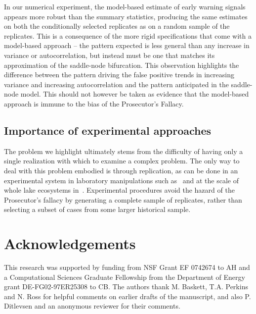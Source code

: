 \documentclass[authoryear,review,12pt]{elsarticle}
\begin{document}
In our numerical experiment, the model-based estimate of early warning
signals appears more robust than the summary statistics, producing
the same estimates on both the conditionally selected replicates as on
a random sample of the replicates.  This is a consequence of the more
rigid specifications that come with a model-based approach -- the pattern
expected is less general than any increase in variance or autocorrelation,
but instead must be one that matches its approximation of the saddle-node
bifurcation. This observation highlights the difference between the
pattern driving the false positive trends in increasing variance and
increasing autocorrelation and the pattern anticipated in the saddle-node
model. This should not however be taken as evidence that the model-based
approach is immune to the bias of the Prosecutor's Fallacy.


\subsection{Importance of experimental approaches} The problem we
highlight ultimately stems from the difficulty of having only a single
realization with which to examine a complex problem.  The only way
to deal with this problem embodied is through replication, as can
be done in an experimental system in laboratory manipulations such
as~\citet{Drake2010, Veraart2011, Dai2012} and at the scale of whole
lake ecosystems in~\citet{Carpenter2011}.  Experimental procedures avoid
the hazard of the Prosecutor's fallacy by generating a complete sample
of replicates, rather than selecting a subset of cases from some larger
historical sample.





 \section{Acknowledgements}
This research was supported by funding from NSF Grant EF 0742674 to AH
and a Computational Sciences Graduate Fellowship from the Department of
Energy grant DE-FG02-97ER25308 to CB. The authors thank M. Baskett, 
T.A. Perkins and N. Ross for helpful comments on earlier drafts of the
manuscript, and also P. Ditlevsen and an anonymous reviewer for their 
comments.  
\end{document}
